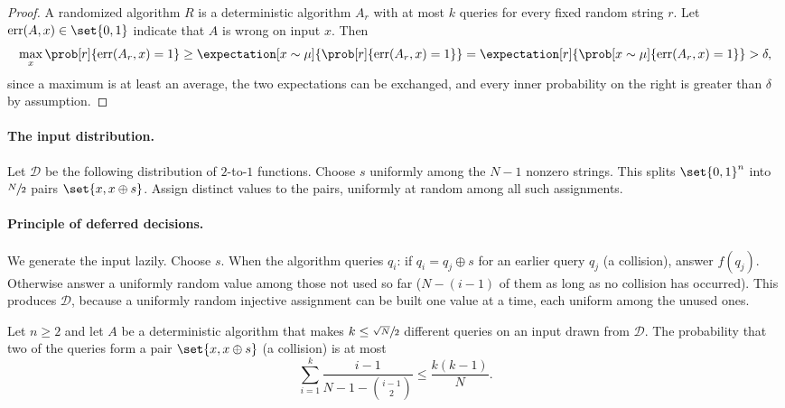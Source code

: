 \begin{proof}
    A randomized algorithm $R$ is a deterministic algorithm $A_r$ with at most $k$ queries for every
    fixed random string $r$. Let $\mathrm{err}(A, x) \in \set{0, 1}$ indicate that $A$ is wrong on
    input $x$. Then
    \[\max_{x} \prob[r]{\mathrm{err}(A_r, x) = 1}
        \geq \expectation[x \sim \mu]{\prob[r]{\mathrm{err}(A_r, x) = 1}}
        = \expectation[r]{\prob[x \sim \mu]{\mathrm{err}(A_r, x) = 1}}
        > \delta,\]
    since a maximum is at least an average, the two expectations can be exchanged, and every inner
    probability on the right is greater than $\delta$ by assumption.
\end{proof}

\paragraph{The input distribution.} Let $\mathcal{D}$ be the following distribution of $2$-to-$1$
functions. Choose $s$ uniformly among the $N - 1$ nonzero strings. This splits $\set{0,1}^n$ into
$\sfrac{N}{2}$ pairs $\set{x, x \oplus s}$. Assign distinct values to the pairs, uniformly at
random among all such assignments.

\paragraph{Principle of deferred decisions.} We generate the input lazily. Choose $s$. When the
algorithm queries $q_i$: if $q_i = q_j \oplus s$ for an earlier query $q_j$ (a collision), answer
$f(q_j)$. Otherwise answer a uniformly random value among those not used so far ($N - (i-1)$ of them
as long as no collision has occurred). This produces $\mathcal{D}$, because a uniformly random
injective assignment can be built one value at a time, each uniform among the unused ones.

\begin{lemma}\label{lem:collision-1001}
    Let $n \geq 2$ and let $A$ be a deterministic algorithm that makes $k \leq \sfrac{\sqrt{N}}{2}$
    different queries on an input drawn from $\mathcal{D}$. The probability that two of the queries
    form a pair $\set{x, x \oplus s}$ (a collision) is at most
    \[\sum_{i=1}^{k} \frac{i-1}{N - 1 - \binom{i-1}{2}} \leq \frac{k(k-1)}{N}.\]
\end{lemma}

